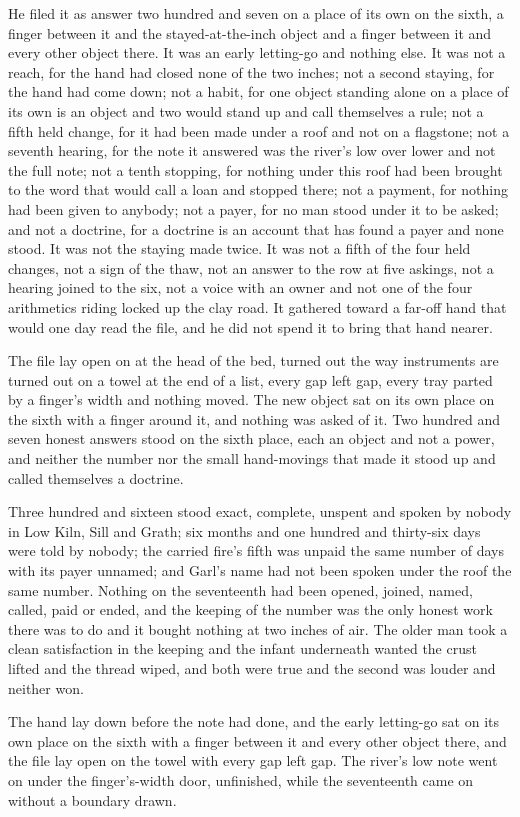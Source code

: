 He filed it as answer two hundred and seven on a place of its own on the sixth, a finger between it and the stayed-at-the-inch object and a finger between it and every other object there. It was an early letting-go and nothing else. It was not a reach, for the hand had closed none of the two inches; not a second staying, for the hand had come down; not a habit, for one object standing alone on a place of its own is an object and two would stand up and call themselves a rule; not a fifth held change, for it had been made under a roof and not on a flagstone; not a seventh hearing, for the note it answered was the river's low over lower and not the full note; not a tenth stopping, for nothing under this roof had been brought to the word that would call a loan and stopped there; not a payment, for nothing had been given to anybody; not a payer, for no man stood under it to be asked; and not a doctrine, for a doctrine is an account that has found a payer and none stood. It was not the staying made twice. It was not a fifth of the four held changes, not a sign of the thaw, not an answer to the row at five askings, not a hearing joined to the six, not a voice with an owner and not one of the four arithmetics riding locked up the clay road. It gathered toward a far-off hand that would one day read the file, and he did not spend it to bring that hand nearer.

The file lay open on  at the head of the bed, turned out the way instruments are turned out on a towel at the end of a list, every gap left gap, every tray parted by a finger's width and nothing moved. The new object sat on its own place on the sixth with a finger around it, and nothing was asked of it. Two hundred and seven honest answers stood on the sixth place, each an object and not a power, and neither the number nor the small hand-movings that made it stood up and called themselves a doctrine.

Three hundred and sixteen stood exact, complete, unspent and spoken by nobody in Low Kiln, Sill and Grath; six months and one hundred and thirty-six days were told by nobody; the carried fire's fifth was unpaid the same number of days with its payer unnamed; and Garl's name had not been spoken under the roof the same number. Nothing on the seventeenth had been opened, joined, named, called, paid or ended, and the keeping of the number was the only honest work there was to do and it bought nothing at two inches of air. The older man took a clean satisfaction in the keeping and the infant underneath wanted the crust lifted and the thread wiped, and both were true and the second was louder and neither won.

The hand lay down before the note had done, and the early letting-go sat on its own place on the sixth with a finger between it and every other object there, and the file lay open on the towel with every gap left gap. The river's low note went on under the finger's-width door, unfinished, while the seventeenth came on without a boundary drawn.
